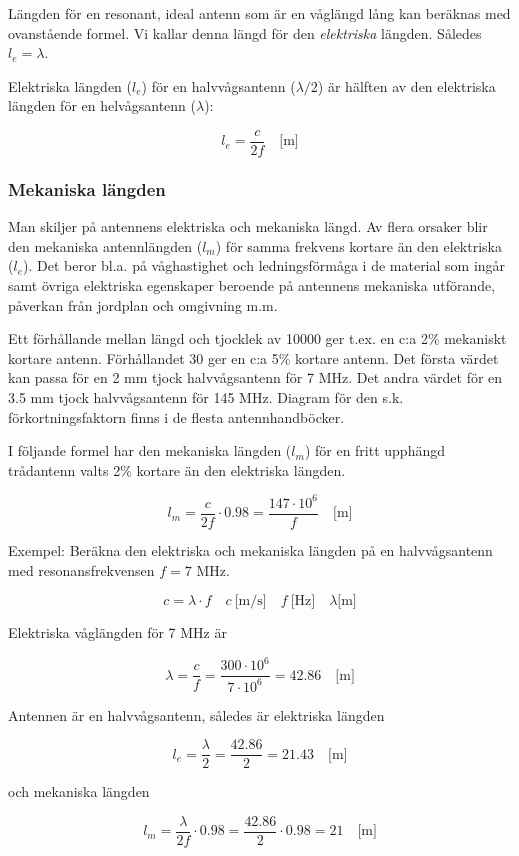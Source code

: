 Längden för en resonant, ideal antenn som är en våglängd lång kan
beräknas med ovanstående formel. Vi kallar denna längd för den
\emph{elektriska} längden. Således \(l_e = \lambda\).

Elektriska längden (\(l_e\)) för en halvvågsantenn (\(\lambda/2\))
är hälften av den elektriska längden för en helvågsantenn
(\(\lambda\)):

\[l_e = \frac{c}{2f} \quad \text{[m]}\]

\subsubsection{Mekaniska längden}

Man skiljer på antennens elektriska och mekaniska längd. Av flera
orsaker blir den mekaniska antennlängden (\(l_m\)) för samma
frekvens kortare än den elektriska (\(l_e\)). Det beror bl.a. på
våghastighet och ledningsförmåga i de material som ingår samt övriga
elektriska egenskaper beroende på antennens mekaniska utförande,
påverkan från jordplan och omgivning m.m.

Ett förhållande mellan längd och tjocklek av 10000 ger t.ex. en c:a
2\% mekaniskt kortare antenn. Förhållandet 30 ger en c:a 5\% kortare
antenn. Det första värdet kan passa för en 2 mm tjock halvvågsantenn
för 7 MHz. Det andra värdet för en 3.5 mm tjock halvvågsantenn för 145
MHz. Diagram för den s.k. förkortningsfaktorn finns i de flesta
antennhandböcker.

I följande formel har den mekaniska längden (\(l_m\)) för en fritt upphängd
trådantenn valts 2\% kortare än den elektriska längden.

\[l_m = \frac{c}{2f} \cdot 0.98 = \frac{147\cdot 10^6}{f} \quad \text{[m]}\]

Exempel: Beräkna den elektriska och mekaniska längden på en halvvågsantenn med
resonansfrekvensen \(f = 7\) MHz.

\[
c = \lambda \cdot f
\quad c\ \text{[m/s]} \quad f\ \text{[Hz]} \quad \lambda \text{[m]}
\]

Elektriska våglängden för 7 MHz är

\[
\lambda = \frac{c}{f} = \frac{300 \cdot 10^6}{7 \cdot 10^6} = 42.86
\quad \text{[m]}
\]

Antennen är en halvvågsantenn, således är elektriska längden

\[
l_e = \frac{\lambda}{2} = \frac{42.86}{2} = 21.43 \quad \text{[m]}
\]

och mekaniska längden

\[
l_m = \frac{\lambda}{2f} \cdot 0.98 = \frac{42.86}{2}\cdot 0.98 = 21
\quad \text{[m]}
\]


